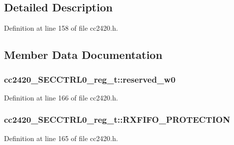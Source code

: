 \subsection{Detailed Description}


Definition at line 158 of file cc2420.\+h.



\subsection{Member Data Documentation}
\subsubsection[{\texorpdfstring{reserved\+\_\+w0}{reserved_w0}}]{ cc2420\+\_\+\+S\+E\+C\+C\+T\+R\+L0\+\_\+reg\+\_\+t\+::reserved\+\_\+w0}\hypertarget{structcc2420___s_e_c_c_t_r_l0__reg__t_a8ad3bc8cdc92cf6c86a16df3dfc7eb89}{}\label{structcc2420___s_e_c_c_t_r_l0__reg__t_a8ad3bc8cdc92cf6c86a16df3dfc7eb89}


Definition at line 166 of file cc2420.\+h.

\subsubsection[{\texorpdfstring{R\+X\+F\+I\+F\+O\+\_\+\+P\+R\+O\+T\+E\+C\+T\+I\+ON}{RXFIFO_PROTECTION}}]{ cc2420\+\_\+\+S\+E\+C\+C\+T\+R\+L0\+\_\+reg\+\_\+t\+::\+R\+X\+F\+I\+F\+O\+\_\+\+P\+R\+O\+T\+E\+C\+T\+I\+ON}\hypertarget{structcc2420___s_e_c_c_t_r_l0__reg__t_a0e50095e6a29023641e076b49731887c}{}\label{structcc2420___s_e_c_c_t_r_l0__reg__t_a0e50095e6a29023641e076b49731887c}


Definition at line 165 of file cc2420.\+h.

